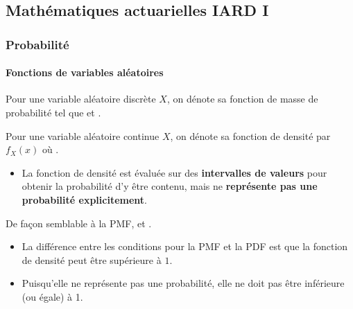 \documentclass[french]{article}
\begin{document}
\begin{multicols*}{2}



\newpage
\part{Mathématiques actuarielles IARD I} \label{chapt:mathIARD}
\section{Probabilité}
\subsection{Fonctions de variables aléatoires} \label{subsec:rvfunct}
\begin{definitionNOHFILL}
Pour une variable aléatoire discrète $X$, on dénote sa fonction de masse de probabilité  tel que  et .
\end{definitionNOHFILL}

\begin{definitionNOHFILL}
Pour une variable aléatoire continue $X$, on dénote sa fonction de densité par $f_{X}(x)$ où . 
\begin{itemize}
	\item	La fonction de densité est évaluée sur des \textbf{intervalles de valeurs} pour obtenir la probabilité d'y être contenu, mais ne \textbf{représente pas une probabilité explicitement}.
\end{itemize}

De façon semblable à la PMF,  et .
\begin{itemize}
	\item	La différence entre les conditions pour la PMF et la PDF est que la fonction de densité peut être supérieure à $1$.
	\item	Puisqu'elle ne représente pas une probabilité, elle ne doit pas être inférieure (ou égale) à 1.
\end{itemize}
\end{definitionNOHFILL}



\end{multicols*}
\end{document}
